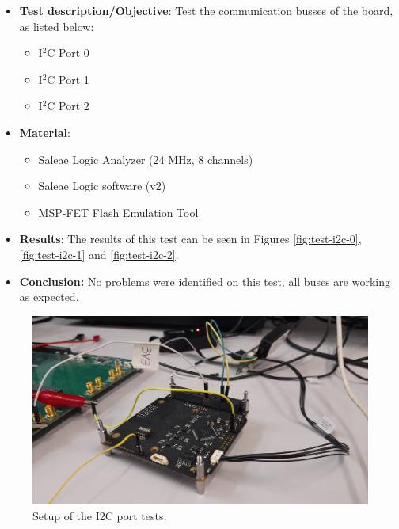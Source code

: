 \begin{itemize}
    \item \textbf{Test description/Objective}: Test the communication busses of the board, as listed below:
        \begin{itemize}
            \item I$^{2}$C Port 0
            \item I$^{2}$C Port 1
            \item I$^{2}$C Port 2
        \end{itemize}
    \item \textbf{Material}:
        \begin{itemize}
            \item Saleae Logic Analyzer (24 MHz, 8 channels)
            \item Saleae Logic software (v2)
            \item MSP-FET Flash Emulation Tool
        \end{itemize}
    \item \textbf{Results}: The results of this test can be seen in Figures \ref{fig:test-i2c-0}, \ref{fig:test-i2c-1} and \ref{fig:test-i2c-2}.
    \item \textbf{Conclusion:} No problems were identified on this test, all buses are working as expected.
\end{itemize}

\begin{figure}[!ht]
    \begin{center}
        \includegraphics[width=\columnwidth]{figures/v07/obdh2-i2c-test.jpg}
        \caption{Setup of the I2C port tests.}
        \label{fig:test-i2c}
    \end{center}
\end{figure}

